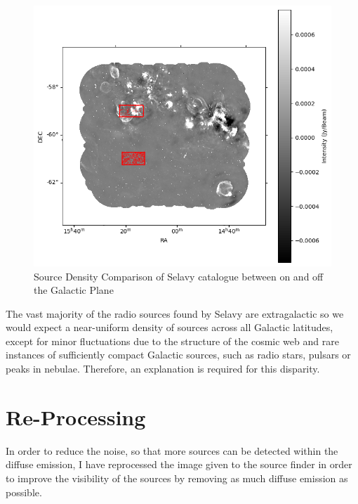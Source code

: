 \begin{figure}
    \centering
    \includegraphics[width=1\linewidth]{Thesis_Template//Figures/source_density_comparison.png}
    \caption[Source density comparison between on and off the Galactic Plane]{Source Density Comparison of Selavy catalogue between on and off the Galactic Plane}
    \label{fig:source density in selavy}
\end{figure}

The vast majority of the radio sources found by Selavy are extragalactic so we would expect a near-uniform density of sources across all Galactic latitudes, except for minor fluctuations due to the structure of the cosmic web and rare instances of sufficiently compact Galactic sources, such as radio stars, pulsars or peaks in nebulae. Therefore, an explanation is required for this disparity.


\section{Re-Processing} 

In order to reduce the noise, so that more sources can be detected within the diffuse emission, I have reprocessed the image given to the source finder in order to improve the visibility of the sources by removing as much diffuse emission as possible.

